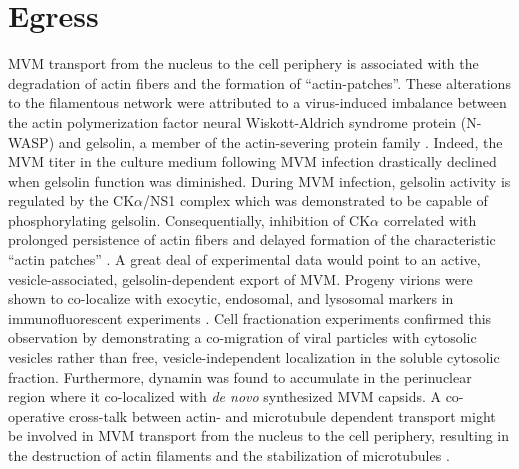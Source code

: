 \section{Egress}
\label{Egress}
MVM transport from the nucleus to the cell periphery is associated with the degradation of actin fibers and the formation of “actin-patches”. These alterations to the filamentous network were attributed to a virus-induced imbalance between the actin polymerization factor neural Wiskott-Aldrich syndrome protein (N-WASP) and gelsolin, a member of the actin-severing protein family \cite{pmid15582663}. Indeed, the MVM titer in the culture medium following MVM infection drastically declined when gelsolin function was diminished. During MVM infection, gelsolin activity is regulated by the CK$\alpha$/NS1 complex which was demonstrated to be capable of phosphorylating gelsolin. Consequentially, inhibition of CK$\alpha$ correlated with prolonged persistence of actin fibers and delayed formation of the characteristic “actin patches” \cite{pmid18704167, pmid16641266}. A great deal of experimental data would point to an active, vesicle-associated, gelsolin-dependent export of MVM. Progeny virions were shown to co-localize with exocytic, endosomal, and lysosomal markers in immunofluorescent experiments \cite{pmid18704167, pmid17287256}. Cell fractionation experiments confirmed this observation by demonstrating a co-migration of viral particles with cytosolic vesicles rather than free, vesicle-independent localization in the soluble cytosolic fraction. Furthermore, dynamin was found to accumulate in the perinuclear region where it co-localized with \textit{de novo} synthesized MVM capsids. A co-operative cross-talk between actin- and microtubule dependent transport \cite{pmid15040446, pmid12383793, pmid17998399} might be involved in MVM transport from the nucleus to the cell periphery, resulting in the destruction of actin filaments and the stabilization of microtubules \cite{pmid18704167}.  


